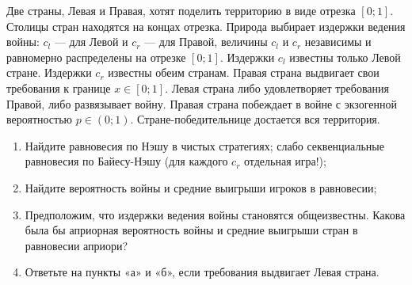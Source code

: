 \begin{problem}\par
\begin{source} \cite[3.5]{slanthcev:gt} \end{source}
Две страны, Левая и Правая, хотят поделить территорию в виде отрезка  $\left[0;1\right]$. Столицы стран находятся на концах отрезка. Природа выбирает издержки ведения войны:  $c_{l} $  — для Левой и  $c_{r} $  — для Правой, величины  $c_{l} $  и  $c_{r} $  независимы и равномерно распределены на отрезке  $\left[0;1\right]$. Издержки  $c_{l} $  известны только Левой стране. Издержки  $c_{r} $  известны обеим странам. Правая страна выдвигает свои требования к границе  $x\in \left[0;1\right]$. Левая страна либо удовлетворяет требования Правой, либо развязывает войну. Правая страна побеждает в войне с экзогенной вероятностью  $p\in \left(0;1\right)$. Стране-победительнице достается вся территория.\par
\begin{enumerate}
\item      Найдите равновесия по Нэшу в чистых стратегиях; слабо секвенциальные равновесия по Байесу-Нэшу ({\red для каждого $c_r$ отдельная игра!});\par
\item      Найдите вероятность войны и средние выигрыши игроков в равновесии;\par
\item       Предположим, что издержки ведения войны становятся общеизвестны. Какова была бы {\red априорная} вероятность войны и средние выигрыши стран в равновесии {\red априори}? \par
\item      Ответьте на пункты «а» и «б», если требования выдвигает Левая страна.
\end{enumerate}


\begin{sol}

\end{sol}
\end{problem}



